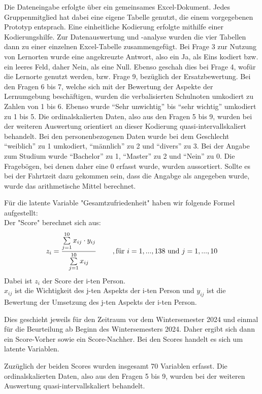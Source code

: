 \documentclass[11pt, a4paper]{article}
\begin{document}
Die Dateneingabe erfolgte über ein gemeinsames Excel-Dokument. Jedes Gruppenmitglied hat dabei eine eigene Tabelle genutzt, die einem vorgegebenen Prototyp entsprach. Eine einheitliche Kodierung erfolgte mithilfe einer Kodierungshilfe. 
Zur Datenauswertung und -analyse wurden die vier Tabellen dann zu einer einzelnen Excel-Tabelle zusammengefügt. 
Bei Frage 3 zur Nutzung von Lernorten wurde eine angekreuzte Antwort, also ein Ja, als Eins kodiert bzw. ein leeres Feld, daher Nein, als eine Null. Ebenso geschah dies bei Frage 4, wofür die Lernorte genutzt werden, bzw. Frage 9, bezüglich der Ersatzbewertung.
Bei den Fragen 6 bis 7, welche sich mit der Bewertung der Aspekte der Lernumgebung beschäftigen, wurden die verbalisierten Schulnoten umkodiert zu Zahlen von 1 bis 6. Ebenso wurde “Sehr unwichtig” bis “sehr wichtig” umkodiert zu 1 bis 5.
Die ordinalskalierten Daten, also aus den Fragen 5 bis 9, wurden bei der weiteren Auswertung orientiert an dieser Kodierung quasi-intervallskaliert behandelt.
Bei den personenbezogenen Daten wurde bei dem Geschlecht “weiblich” zu 1 umkodiert, “männlich” zu 2 und “divers” zu 3. 
Bei der Angabe zum Studium wurde “Bachelor” zu 1, “Master” zu 2 und “Nein” zu 0. Die Fragebögen, bei denen daher eine 0 erfasst wurde, wurden aussortiert.
Sollte es bei der Fahrtzeit dazu gekommen sein, dass die Angabge als  angegeben wurde, wurde das arithmetische Mittel berechnet.

Für die latente Variable "Gesamtzufriedenheit" haben wir folgende Formel aufgestellt:  \\
Der "Score" berechnet sich aus:
\begin{equation*}
	z_i = \frac{\sum\limits_{j=1}^{10}x_{ij}\cdot  y_{ij}}{\sum\limits_{j=1}^{10}x_{ij}} \hspace{0.8cm} , \text{für} \ 
	i=1,...,138\  \text{und} \ j=1,...,10
\end{equation*} 
Dabei ist $z_i$ der Score der i-ten Person. \\
$x_{ij}$ ist die Wichtigkeit des j-ten Aspekts der i-ten Person und
$y_{ij}$ ist die Bewertung der Umsetzung des j-ten Aspekts der i-ten Person.


Dies geschieht jeweils für den Zeitraum vor dem Wintersemester 2024 und einmal für die Beurteilung ab Beginn des Wintersemesters 2024. Daher ergibt sich dann ein Score-Vorher sowie ein Score-Nachher. Bei den Scores handelt es sich um latente Variablen.

Zuzüglich der beiden Scores wurden insgesamt 70 Variablen erfasst.
Die ordinalskalierten Daten, also aus den Fragen 5 bis 9, wurden bei der weiteren Auswertung quasi-intervallskaliert behandelt.
\end{document}
